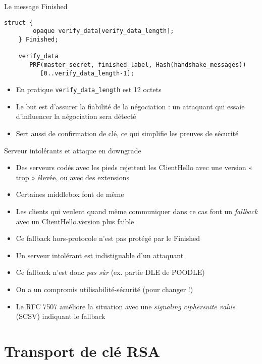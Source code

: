 \documentclass{mpg-ep-slides}
\begin{document}
\begin{frame}[containsverbatim]{Le message Finished}
  \begin{Verbatim}[gobble=4, fontsize=\footnotesize]
    struct {
        opaque verify_data[verify_data_length];
    } Finished;

    verify_data
       PRF(master_secret, finished_label, Hash(handshake_messages))
          [0..verify_data_length-1];
  \end{Verbatim}

  \begin{itemize}
    \item En pratique \texttt{verify_data_length} est 12 octets
    \item Le but est d'assurer la fiabilité de la négociation : un attaquant
      qui essaie d'influencer la négociation sera détecté
    \item Sert aussi de confirmation de clé, ce qui simplifie les preuves de
      sécurité
  \end{itemize}
\end{frame}

\begin{frame}{Serveur intolérants et attaque en downgrade}
  \begin{itemize}
    \item Des serveurs codés avec les pieds rejettent les ClientHello avec
      une version « trop » élevée, ou avec des extensions
    \item Certaines middlebox font de même
    \item Les clients qui veulent quand même communiquer dans ce cas font un
      \emph{fallback} avec un ClientHello.version plus faible
    \item Ce fallback hors-protocole n'est pas protégé par le Finished
    \item Un serveur intolérant est indistiguable d'un attaquant
    \item Ce fallback n'est donc \emph{pas sûr} (ex. partie DLE de POODLE)
    \item On a un compromis utilisabilité-sécurité (pour changer !)
    \item Le RFC 7507 améliore la situation avec une \emph{signaling
        ciphersuite value} (SCSV) indiquant le fallback
  \end{itemize}
\end{frame}

\section[RSA]{Transport de clé RSA}
\tocsect
\end{document}
